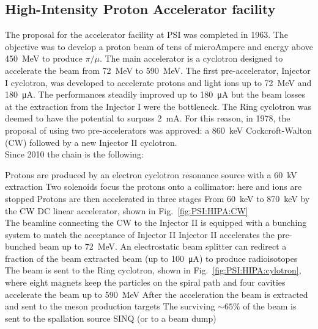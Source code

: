 \begin{refsection}
    \subsection{High-Intensity Proton Accelerator facility}
        \label{sec:hipa}
        The proposal for the accelerator facility at PSI was completed in 1963. The objective was to develop a proton beam of tens of microAmpere and energy above \SI{450}{MeV} to produce $\pi/\mu$.
        The main accelerator is a cyclotron designed to accelerate the beam from \SI{72}{MeV} to \SI{590}{MeV}. 
        The first pre-accelerator, Injector I cyclotron, was developed to accelerate protons and light ions up to \SI{72}{MeV} and \SI{180}{\micro A}.
        The performances steadily improved up to \SI{180}{\micro A} but the beam losses at the extraction from the Injector I were the bottleneck.
        The Ring cyclotron was deemed to have the potential to surpass \SI{2}{mA}. For this reason,  in 1978, the proposal of using two pre-accelerators was approved: a \SI{860}{keV} Cockcroft-Walton (CW) followed by a new Injector II cyclotron.\\
        Since 2010 the chain is the following:
        \begin{outline}
            \1 Protons are produced by an electron cyclotron resonance source with a \SI{60}{kV} extraction
            \1 Two solenoids focus the protons onto a collimator: here  and  ions are stopped
            \1 Protons are then accelerated in three stages
                \2 From \SI{60}{keV} to \SI{870}{keV} by the CW DC linear accelerator, shown in Fig.~\ref{fig:PSI:HIPA:CW}\\
                The beamline connecting the CW to the Injector II is equipped with a bunching system to match the acceptance of Injector II
                \2 Injector II accelerates the pre-bunched beam up to \SI{72}{MeV}.
                An electrostatic beam splitter can redirect a fraction of the beam extracted beam (up to \SI{100}{\micro A}) to produce radioisotopes 
                \2 The beam is sent to the Ring cyclotron, shown in Fig.~\ref{fig:PSI:HIPA:cylotron}, where eight magnets keep the particles on the spiral path and four cavities accelerate the beam up to \SI{590}{MeV}
            \1 After the acceleration the beam is extracted and sent to the meson production targets
            \1 The surviving $\sim65\%$ of the beam is sent to the spallation source SINQ (or to a beam dump)
        \end{outline}
            \begin{figure}

\end{figure}
\end{refsection}
